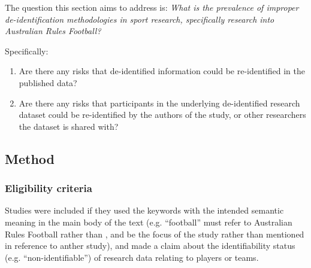 The question this section aims to address is: \textit{What is the prevalence of improper de-identification methodologies in sport research, specifically research into Australian Rules Football?}

Specifically:
\begin{enumerate}
  \item Are there any risks that de-identified information could be re-identified in the published data?
  \item Are there any risks that participants in the underlying de-identified research dataset could be re-identified by the authors of the study, or other researchers the dataset is shared with?
\end{enumerate}


\subsection{Method}




\subsubsection{Eligibility criteria}
\label{sec:eligibility-criteria}

Studies were included if they used the keywords with the intended semantic meaning in the main body of the text (e.g. ``football'' must refer to Australian Rules Football rather than \soccer{}, and be the focus of the study rather than mentioned in reference to anther study), and made a claim about the identifiability status (e.g. ``non-identifiable'') of research data relating to players or teams.



